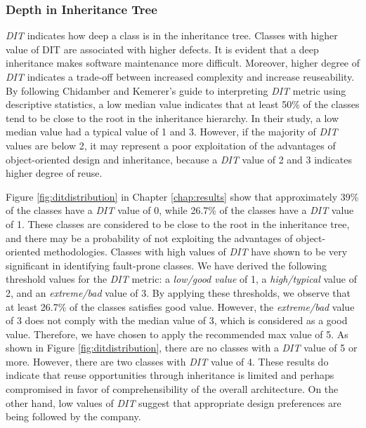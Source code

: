 \subsubsection{Depth in Inheritance Tree}
\textit{DIT} indicates how deep a class is in the inheritance tree. Classes with higher value of DIT are associated with higher defects\cite{subramanyam2003empirical}. It is evident that a deep inheritance makes software maintenance more difficult\cite{daly1996evaluating}. Moreover, higher degree of \textit{DIT} indicates a trade-off between increased complexity and increase reuseability. By following Chidamber and Kemerer's\cite{chidamber1994metrics} guide to interpreting \textit{DIT} metric using descriptive statistics, a low median value indicates that at least 50\% of the classes tend to be close to the root in the inheritance hierarchy. In their study, a low median value had a typical value of 1 and 3. However, if the majority of \textit{DIT} values are below 2, it may represent a poor exploitation of the advantages of object-oriented design and inheritance, because a \textit{DIT} value of 2 and 3 indicates higher degree of reuse. 

Figure \ref{fig:ditdistribution} in Chapter \ref{chap:results} show that approximately 39\% of the classes have a \textit{DIT} value of 0, while 26.7\% of the classes have a \textit{DIT} value of 1. These classes are considered to be close to the root in the inheritance tree, and there may be a probability of not exploiting the advantages of object-oriented methodologies. Classes with high values of \textit{DIT} have shown to be very significant in identifying fault-prone classes\cite{basili1996validation}. We have derived the following threshold values for the \textit{DIT} metric: a \textit{low/good value} of 1, a \textit{high/typical} value of 2, and an \textit{extreme/bad} value of 3. By applying these thresholds, we observe that at least 26.7\% of the classes satisfies good value. However, the \textit{extreme/bad} value of 3 does not comply with the median value of 3, which is considered as a good value\cite{chidamber1994metrics}. Therefore, we have chosen to apply the recommended max value of 5. As shown in Figure \ref{fig:ditdistribution}, there are no classes with a \textit{DIT} value of 5 or more. However, there are two classes with \textit{DIT} value of 4. These results do indicate that reuse opportunities through inheritance is limited and perhaps compromised in favor of comprehensibility of the overall architecture. On the other hand, low values of \textit{DIT} suggest that appropriate design preferences are being followed by the company\cite{subramanyam2003empirical}.

